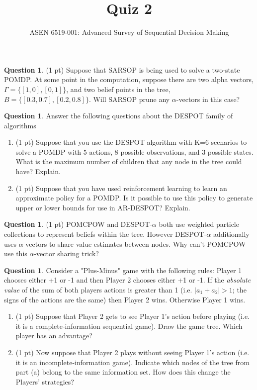 \documentclass{article}
\title{Quiz 2}
\author{ASEN 6519-001: Advanced Survey of Sequential Decision Making}
\theoremstyle{definition}
\newtheorem{question}[thm]{Question}
\begin{document}
\maketitle

\begin{question}
    (1 pt) Suppose that SARSOP is being used to solve a two-state POMDP. At some point in the computation, suppose there are two alpha vectors, $\Gamma = \{[1, 0], [0, 1]\}$, and two belief points in the tree, $B = \{[0.3, 0.7], [0.2, 0.8]\}$. Will SARSOP prune any $\alpha$-vectors in this case?
\end{question}

\begin{question}
    Answer the following questions about the DESPOT family of algorithms
    \begin{enumerate}[label=\alph*)]
        \item (1 pt) Suppose that you use the DESPOT algorithm with K=6 scenarios to solve a POMDP with 5 actions, 8 possible observations, and 3 possible states. What is the maximum number of children that any node in the tree could have? Explain.
        \item (1 pt) Suppose that you have used reinforcement learning to learn an approximate policy for a POMDP. Is it possible to use this policy to generate upper or lower bounds for use in AR-DESPOT? Explain.
    \end{enumerate}
\end{question}


\begin{question}
    (1 pt) POMCPOW and DESPOT-$\alpha$ both use weighted particle collections to represent beliefs within the tree. However DESPOT-$\alpha$ additionally uses $\alpha$-vectors to share value estimates between nodes. Why can't POMCPOW use this $\alpha$-vector sharing trick?
\end{question}


\begin{question}
    Consider a "Plus-Minus" game with the following rules: Player 1 chooses either +1 or -1 and then Player 2 chooses either +1 or -1. If the \emph{absolute value} of the sum of both players actions is greater than 1 (i.e. $|a_1 + a_2| > 1$; the signs of the actions are the same) then Player 2 wins. Otherwise Player 1 wins.
    \begin{enumerate}[label=\alph*)]
        \item (1 pt) Suppose that Player 2 gets to see Player 1's action before playing (i.e. it is a complete-information sequential game). Draw the game tree. Which player has an advantage?
        \item (1 pt) Now suppose that Player 2 plays without seeing Player 1's action (i.e. it is an incomplete-information game). Indicate which nodes of the tree from part (a) belong to the same information set. How does this change the Players' strategies? 
    \end{enumerate}
\end{question}
\end{document}
